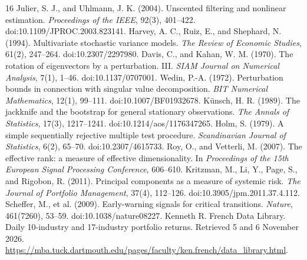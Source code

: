 \documentclass[11pt]{article}
\begin{document}
\FloatBarrier
\begin{thebibliography}{16}
 Julier, S. J., and Uhlmann, J. K. (2004). Unscented filtering and nonlinear estimation. \emph{Proceedings of the IEEE}, 92(3), 401--422. doi:10.1109/JPROC.2003.823141.
 Harvey, A. C., Ruiz, E., and Shephard, N. (1994). Multivariate stochastic variance models. \emph{The Review of Economic Studies}, 61(2), 247--264. doi:10.2307/2297980.
 Davis, C., and Kahan, W. M. (1970). The rotation of eigenvectors by a perturbation. III. \emph{SIAM Journal on Numerical Analysis}, 7(1), 1--46. doi:10.1137/0707001.
 Wedin, P.-A. (1972). Perturbation bounds in connection with singular value decomposition. \emph{BIT Numerical Mathematics}, 12(1), 99--111. doi:10.1007/BF01932678.
 K\"unsch, H. R. (1989). The jackknife and the bootstrap for general stationary observations. \emph{The Annals of Statistics}, 17(3), 1217--1241. doi:10.1214/aos/1176347265.
 Holm, S. (1979). A simple sequentially rejective multiple test procedure. \emph{Scandinavian Journal of Statistics}, 6(2), 65--70. doi:10.2307/4615733.
 Roy, O., and Vetterli, M. (2007). The effective rank: a measure of effective dimensionality. In \emph{Proceedings of the 15th European Signal Processing Conference}, 606--610.
 Kritzman, M., Li, Y., Page, S., and Rigobon, R. (2011). Principal components as a measure of systemic risk. \emph{The Journal of Portfolio Management}, 37(4), 112--126. doi:10.3905/jpm.2011.37.4.112.
 Scheffer, M., et al. (2009). Early-warning signals for critical transitions. \emph{Nature}, 461(7260), 53--59. doi:10.1038/nature08227.
 Kenneth R. French Data Library. Daily 10-industry and 17-industry portfolio returns. Retrieved 5 and 6 November 2026. \url{https://mba.tuck.dartmouth.edu/pages/faculty/ken.french/data_library.html}.
\end{thebibliography}
\end{document}
